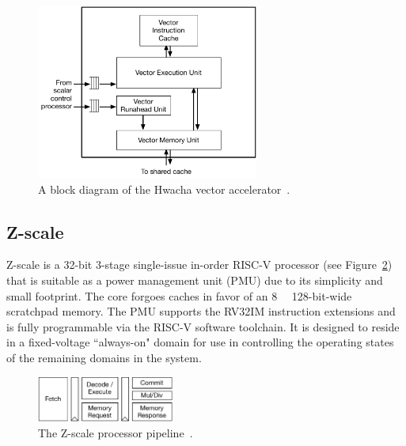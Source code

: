 \documentclass[graybox]{svmult}
\begin{document}
\begin{figure}
  \centering
  \includegraphics[width=0.65\textwidth]{6-raven3-hwacha}
  \caption{A block diagram of the Hwacha vector accelerator~\cite{Zimmer2016}.}
  \label{fig:6-raven3-hwacha}
\end{figure}


\subsection{Z-scale}

Z-scale is a 32-bit 3-stage single-issue in-order RISC-V processor (see Figure~\ref{fig:4-zscale}) that is suitable as a power management unit (PMU) due to its simplicity and small footprint.
The core forgoes caches in favor of an \SI{8}{\kibi\byte} 128-bit-wide scratchpad memory.
The PMU supports the RV32IM instruction extensions and is fully programmable via the RISC-V software toolchain.
It is designed to reside in a fixed-voltage ``always-on" domain for use in controlling the operating states of the remaining domains in the system.

\begin{figure}
  \centering
  \includegraphics[width=0.4\textwidth]{4-zscale}
  \caption{The Z-scale processor pipeline~\cite{Keller2017}.}
  \label{fig:4-zscale}
\end{figure}
\end{document}
